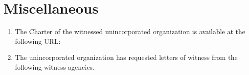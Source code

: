 \section{Miscellaneous}
\begin{enumerate}
    \item The Charter of the witnessed unincorporated organization is available at the following URL:\\
        
    \item The unincorporated organization has requested letters of witness from the following witness agencies.
    \begin{itemize}
        
    \end{itemize}
\end{enumerate}

\makeeof








